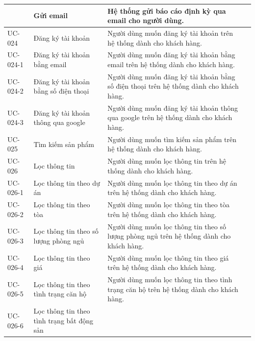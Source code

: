 \documentclass[12pt,a4paper]{article}
\begin{document}
\begin{center}
\begin{longtable}{|p{2.5cm}|p{4.5cm}|p{7.5cm}|c|}
            & Gửi email
            & Hệ thống gửi báo cáo định kỳ qua email cho người dùng.
            \\ \hline
            UC-024
            & Đăng ký tài khoản
            & Người dùng muốn đăng ký tài khoản trên hệ thống dành cho khách hàng.
            \\ \hline
            UC-024-1
            & Đăng ký tài khoản bằng email
            & Người dùng muốn đăng ký tài khoản bằng email trên hệ thống dành cho khách hàng.
            \\ \hline
            UC-024-2
            & Đăng ký tài khoản bằng số điện thoại
            & Người dùng muốn đăng ký tài khoản bằng số điện thoại trên hệ thống dành cho khách hàng.
            \\ \hline
            UC-024-3
            & Đăng ký tài khoản thông qua google
            & Người dùng muốn đăng ký tài khoản thông qua google trên hệ thống dành cho khách hàng.
            \\ \hline
            UC-025
            & Tìm kiếm sản phẩm
            & Người dùng muốn tìm kiếm sản phẩm trên hệ thống dành cho khách hàng.
            \\ \hline
            UC-026
            & Lọc thông tin
            & Người dùng muốn lọc thông tin trên hệ thống dành cho khách hàng.
            \\ \hline
            UC-026-1
            & Lọc thông tin theo dự án
            & Người dùng muốn lọc thông tin theo dự án trên hệ thống dành cho khách hàng.
            \\ \hline
            UC-026-2
            & Lọc thông tin theo tòa
            & Người dùng muốn lọc thông tin theo tòa trên hệ thống dành cho khách hàng.
            \\ \hline
            UC-026-3
            & Lọc thông tin theo số lượng phòng ngủ
            & Người dùng muốn lọc thông tin theo số lượng phòng ngủ trên hệ thống dành cho khách hàng.
            \\ \hline
            UC-026-4
            & Lọc thông tin theo giá
            & Người dùng muốn lọc thông tin theo giá trên hệ thống dành cho khách hàng.
            \\ \hline
            UC-026-5
            & Lọc thông tin theo tình trạng căn hộ
            & Người dùng muốn lọc thông tin theo tình trạng căn hộ trên hệ thống dành cho khách hàng.
            \\ \hline
            UC-026-6
            & Lọc thông tin theo tình trạng bất động sản

\end{longtable}
\end{center}
\end{document}
